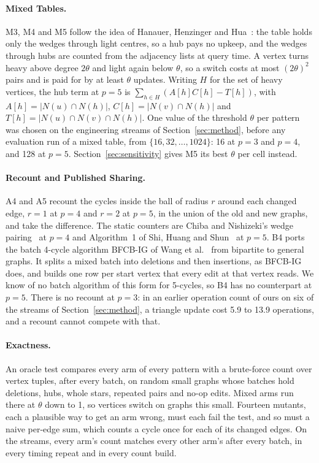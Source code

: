 \paragraph{Mixed Tables.}
M3, M4 and M5 follow the idea of Hanauer, Henzinger and Hua~\cite{hhh}: the table holds only the wedges through light centres, so a hub pays no upkeep, and the wedges through hubs are counted from the adjacency lists at query time.
A vertex turns heavy above degree $2\theta$ and light again below $\theta$, so a switch costs at most $(2\theta)^2$ pairs and is paid for by at least $\theta$ updates.
Writing $H$ for the set of heavy vertices, the hub term at $p = 5$ is $\sum_{h \in H} (A[h] C[h] - T[h])$, with $A[h] = |N(u) \cap N(h)|$, $C[h] = |N(v) \cap N(h)|$ and $T[h] = |N(u) \cap N(v) \cap N(h)|$.
One value of the threshold $\theta$ per pattern was chosen on the engineering streams of Section~\ref{sec:method}, before any evaluation run of a mixed table, from $\{16, 32, \dots, 1024\}$: 16 at $p = 3$ and $p = 4$, and 128 at $p = 5$.
Section~\ref{sec:sensitivity} gives M5 its best $\theta$ per cell instead.

\paragraph{Recount and Published Sharing.}
A4 and A5 recount the cycles inside the ball of radius $r$ around each changed edge, $r = 1$ at $p = 4$ and $r = 2$ at $p = 5$, in the union of the old and new graphs, and take the difference.
The static counters are Chiba and Nishizeki's wedge pairing~\cite{chiba-nishizeki} at $p = 4$ and Algorithm~1 of Shi, Huang and Shun~\cite{shi-huang-shun} at $p = 5$.
B4 ports the batch 4-cycle algorithm BFCB-IG of Wang et al.~\cite{bfcb} from bipartite to general graphs.
It splits a mixed batch into deletions and then insertions, as BFCB-IG does, and builds one row per start vertex that every edit at that vertex reads.
We know of no batch algorithm of this form for 5-cycles, so B4 has no counterpart at $p = 5$.
There is no recount at $p = 3$: in an earlier operation count of ours on six of the streams of Section~\ref{sec:method}, a triangle update cost 5.9 to 13.9 operations, and a recount cannot compete with that.

\paragraph{Exactness.}
An oracle test compares every arm of every pattern with a brute-force count over vertex tuples, after every batch, on random small graphs whose batches hold deletions, hubs, whole stars, repeated pairs and no-op edits.
Mixed arms run there at $\theta$ down to 1, so vertices switch on graphs this small.
Fourteen mutants, each a plausible way to get an arm wrong, must each fail the test, and so must a naive per-edge sum, which counts a cycle once for each of its changed edges.
On the streams, every arm's count matches every other arm's after every batch, in every timing repeat and in every count build.

